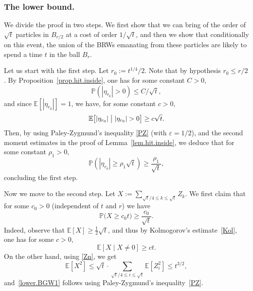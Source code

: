 \documentclass[JEP,XML,SOM,Unicode,NoFloatCountersInSection,published]{cedram}
\theoremstyle{plain}
\theoremstyle{definition}
\newcommand{\1}{{\text{\Large $\mathfrak 1$}}}
\let\epsilon\varepsilon
\begin{document}
\subsubsection*{The lower bound.}
We divide the proof in two steps.
We first show that we can bring of the order of $\sqrt t$
particles in $B_{r/2}$ at a cost of order $1/\sqrt t$,
and then we show that conditionally on this event, the union of the BRWs emanating from these particles are likely to spend a time $t$ in the ball $B_r$.

Let us start with the first step. Let $r_0 := t^{1/4}/2$. Note that by hypothesis $r_0 \le r/2$.
By Proposition~\ref{prop.hit.inside}, one has for some constant $C>0$,
\[
\mathbb P(|\eta_{r_0}|> 0) \le C/\sqrt t,
\]
and since $\mathbb E[|\eta_{r_0}|]=1$,
we have, for some constant $c>0$,
\[
\mathbb E\big[|\eta_{r_0}|\bigm| |\eta_{r_0}|> 0\big]\ge
c\sqrt t.
\]
Then, by using Paley-Zygmund's inequality \eqref{PZ} (with $\epsilon=1/2$),
and the second
moment estimates in the proof of Lemma~\ref{lem.hit.inside}, we deduce that for some constant $\rho_1>0$,
\begin{equation}\label{lower.1st}
\mathbb P(|\eta_{r_0}|\ge \rho_1\sqrt t) \ge \frac{\rho_1}{\sqrt t},
\end{equation}
concluding the first step.

Now we move to the second step.
Let $X:=\sum_{\sqrt t/4\le k\le {\sqrt t} } Z_k$.
We first claim that for some $c_0>0$ (independent of $t$ and $r$) we have
\begin{equation}\label{lower.BGW1}
\mathbb P\big(X \ge c_0 t\big) \ge\frac{c_0}{\sqrt t}.
\end{equation}
Indeed, observe that $\mathbb E[X] \ge \frac{1}{2}\sqrt t$, and
thus by Kolmogorov's estimate~\eqref{Kol}, one has for some $c>0$,
\[
\mathbb E[X\mid X\neq 0] \ge ct.
\]
On the other hand, using \eqref{Zn}, we get
\[
\mathbb E[X^2] \le \sqrt t\cdot
\sum_{\sqrt t/4\le i\le \sqrt t}
\mathbb E[Z_i^2] \le t^{3/2},
\]
and~\eqref{lower.BGW1} follows using Paley-Zygmund's inequality~\eqref{PZ}.
\end{document}

